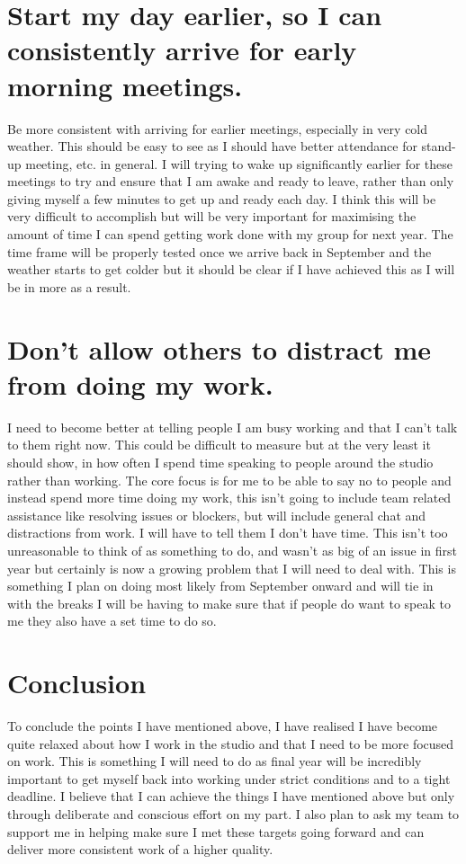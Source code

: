 \documentclass{scrartcl}
\begin{document}
\section{Start my day earlier, so I can consistently arrive for early morning meetings.}

Be more consistent with arriving for earlier meetings, especially in very cold weather. This should be easy to see as I should have better attendance for stand-up meeting, etc. in general. I will trying to wake up significantly earlier for these meetings to try and ensure that I am awake and ready to leave, rather than only giving myself a few minutes to get up and ready each day. I think this will be very difficult to accomplish but will be very important for maximising the amount of time I can spend getting work done with my group for next year. The time frame will be properly tested once we arrive back in September and the weather starts to get colder but it should be clear if I have achieved this as I will be in more as a result.

\section{Don't allow others to distract me from doing my work.}

I need to become better at telling people I am busy working and that I can't talk to them right now. This could be difficult to measure but at the very least it should show, in how often I spend time speaking to people around the studio rather than working. The core focus is for me to be able to say no to people and instead spend more time doing my work, this isn't going to include team related assistance like resolving issues or blockers, but will include general chat and distractions from work. I will have to tell them I don't have time. This isn't too unreasonable to think of as something to do, and wasn't as big of an issue in first year but certainly is now a growing problem that I will need to deal with. This is something I plan on doing most likely from September onward and will tie in with the breaks I will be having to make sure that if people do want to speak to me they also have a set time to do so.

\section*{Conclusion}

To conclude the points I have mentioned above, I have realised I have become quite relaxed about how I work in the studio and that I need to be more focused on work. This is something I will need to do as final year will be incredibly important to get myself back into working under strict conditions and to a tight deadline. I believe that I can achieve the things I have mentioned above but only through deliberate and conscious effort on my part. I also plan to ask my team to support me in helping make sure I met these targets going forward and can deliver more consistent work of a higher quality.
\end{document}
